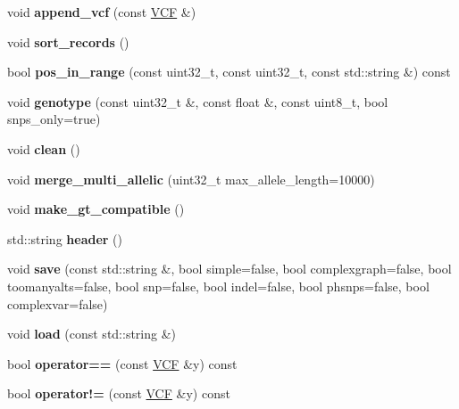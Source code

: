 \begin{DoxyCompactItemize}
void {\bfseries append\+\_\+vcf} (const \hyperlink{classVCF}{V\+CF} \&)
\item 
\mbox{\label{classVCF_a1d357c818e4a6de958350985ca85f19a}} 
void {\bfseries sort\+\_\+records} ()
\item 
\mbox{\label{classVCF_a533bba4aca3713e4459b2175071a5539}} 
bool {\bfseries pos\+\_\+in\+\_\+range} (const uint32\+\_\+t, const uint32\+\_\+t, const std\+::string \&) const
\item 
\mbox{\label{classVCF_a225a043c79990aba1f13a299eb346445}} 
void {\bfseries genotype} (const uint32\+\_\+t \&, const float \&, const uint8\+\_\+t, bool snps\+\_\+only=true)
\item 
\mbox{\label{classVCF_a908fce1dfb9d0eef4f956430dda8b232}} 
void {\bfseries clean} ()
\item 
\mbox{\label{classVCF_ab83cca445adf503d609d0a30d6456358}} 
void {\bfseries merge\+\_\+multi\+\_\+allelic} (uint32\+\_\+t max\+\_\+allele\+\_\+length=10000)
\item 
\mbox{\label{classVCF_ac0a8bd5b103f7837616b1c7a8269950c}} 
void {\bfseries make\+\_\+gt\+\_\+compatible} ()
\item 
\mbox{\label{classVCF_a14a2d3805017bceee9eff41e39bf98a5}} 
std\+::string {\bfseries header} ()
\item 
\mbox{\label{classVCF_a2ccca210cdfd1f8a667abaa569161cb5}} 
void {\bfseries save} (const std\+::string \&, bool simple=false, bool complexgraph=false, bool toomanyalts=false, bool snp=false, bool indel=false, bool phsnps=false, bool complexvar=false)
\item 
\mbox{\label{classVCF_a9fd1ea9c320328019fababacc7ccc2ca}} 
void {\bfseries load} (const std\+::string \&)
\item 
\mbox{\label{classVCF_a32b580e2e2e22abddce35d916a865eb6}} 
bool {\bfseries operator==} (const \hyperlink{classVCF}{V\+CF} \&y) const
\item 
\mbox{\label{classVCF_a7abcb6100aeb61c9a305b11df90880e7}} 
bool {\bfseries operator!=} (const \hyperlink{classVCF}{V\+CF} \&y) const
\end{DoxyCompactItemize}
